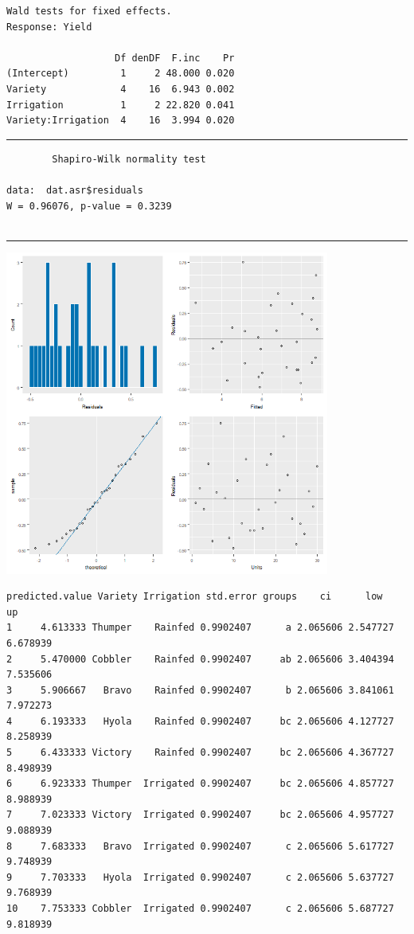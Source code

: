 \documentclass[a4paper, 10pt, fleqn, twosided]{memoir}
\begin{document}
\begin{tcolorbox}[title = Exercise 14 output]
\begin{verbatim}
Wald tests for fixed effects.
Response: Yield

                   Df denDF  F.inc    Pr
(Intercept)         1     2 48.000 0.020
Variety             4    16  6.943 0.002
Irrigation          1     2 22.820 0.041
Variety:Irrigation  4    16  3.994 0.020
\end{verbatim}
{\color{outpt} {\hrule height 1pt}}
\begin{verbatim}
        Shapiro-Wilk normality test

data:  dat.asr$residuals
W = 0.96076, p-value = 0.3239


\end{verbatim}
{\color{outpt} {\hrule height 1pt}} \vspace{0.2cm}

\includegraphics[width=0.8\textwidth, frame]{Exercise14Resplot.png}
\end{tcolorbox}

\begin{tcolorbox}[title = Exercise 14 output continued]
\begin{verbatim}
predicted.value Variety Irrigation std.error groups    ci      low       up
1     4.613333 Thumper    Rainfed 0.9902407      a 2.065606 2.547727 6.678939
2     5.470000 Cobbler    Rainfed 0.9902407     ab 2.065606 3.404394 7.535606
3     5.906667   Bravo    Rainfed 0.9902407      b 2.065606 3.841061 7.972273
4     6.193333   Hyola    Rainfed 0.9902407     bc 2.065606 4.127727 8.258939
5     6.433333 Victory    Rainfed 0.9902407     bc 2.065606 4.367727 8.498939
6     6.923333 Thumper  Irrigated 0.9902407     bc 2.065606 4.857727 8.988939
7     7.023333 Victory  Irrigated 0.9902407     bc 2.065606 4.957727 9.088939
8     7.683333   Bravo  Irrigated 0.9902407      c 2.065606 5.617727 9.748939
9     7.703333   Hyola  Irrigated 0.9902407      c 2.065606 5.637727 9.768939
10    7.753333 Cobbler  Irrigated 0.9902407      c 2.065606 5.687727 9.818939
\end{verbatim}
\end{tcolorbox}
\end{document}
